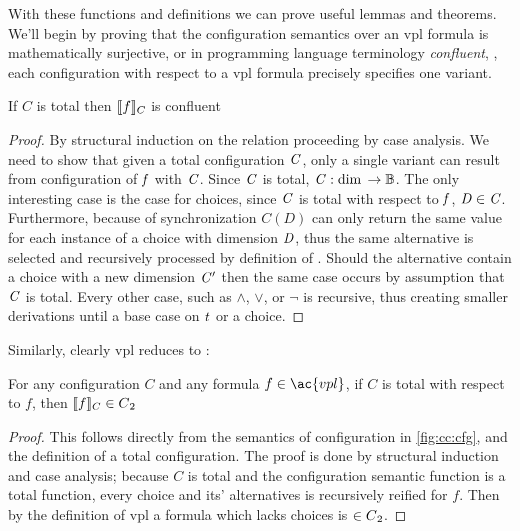 With these functions and definitions we can prove useful lemmas and theorems.
%
We'll begin by proving that the configuration semantics over an \ac{vpl} formula
is mathematically surjective, or in programming language terminology
\emph{confluent}, \ie{}, each configuration with respect to a \ac{vpl} formula
precisely specifies one variant.
%
\begin{theorem}
  \label{thm:vpl:confluent}
  If $C$ is total then \ensuremath{\semL f \semR_{C}} is confluent
\end{theorem}
%
\begin{proof}
  By structural induction on the relation  proceeding by case
  analysis. We need to show that given a total configuration $\mathit{C}$, only a
  single variant can result from configuration of $\mathit{f}$ with $\mathit{C}$. Since
  $\mathit{C}$ is total, $\mathit{C : \dim{} \rightarrow \mathbb{B}{}}$. The only
  interesting case is the case for choices, since $\mathit{C}$ is total with respect
  to $\mathit{f}$, $\mathit{D \in C}$. Furthermore, because of synchronization $C(D)$
  can only return the same value for each instance of a choice with dimension
  $\mathit{D}$, thus the same alternative is selected and recursively processed by
  definition of \sem[]. Should the alternative contain a choice with a new
  dimension $\mathit{C'}$ then the same case occurs by assumption that $\mathit{C}$ is
  total. Every other case, such as $\wedge{}$, $\vee$, or $\neg$ is recursive,
  thus creating smaller derivations until a base case on $\mathit{t}$ or a choice.
\end{proof}
%
Similarly, clearly \ac{vpl} reduces to \pl{}:
%
\begin{theorem}
  \label{thm:vpltopl}
  For any configuration $C$ and any formula $f \in \ac{vpl}$, if $C$ is total
  with respect to $f$, then $\sem[C]{f} \in \pl{}$
\end{theorem}
%
\begin{proof}
  This follows directly from the semantics of configuration in
  \autoref{fig:cc:cfg}, and the definition of a total configuration. The proof
  is done by structural induction and case analysis; because $C$ is total and
  the configuration semantic function is a total function, every choice and its'
  alternatives is recursively reified for $f$. Then by the definition of
  \ac{vpl} a formula which lacks choices is $\in {C\textsubscript{2}}{}$.
\end{proof}



